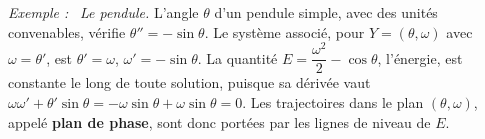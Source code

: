 \documentclass[a4paper,twoside]{report}
\newcommand{\mot}[1]{\textcolor{rougecours}{\textbf{#1}}}
\newenvironment{exemple}%
 {\par\needspace{6\baselineskip}\vspace{1mm}\begin{list}{}{\leftmargin=1cm \rightmargin=0.5cm}\item[]%
  \textit{Exemple :}~}%
 {\end{list}\vspace{1mm}}
\begin{document}
\begin{exemple}
\emph{Le pendule.} L'angle $\theta$ d'un pendule simple, avec des unités convenables, vérifie $\theta'' = -\sin\theta$. Le système associé, pour $Y = (\theta, \omega)$ avec $\omega = \theta'$, est $\theta' = \omega$, $\omega' = -\sin\theta$. La quantité $E = \dfrac{\omega^{2}}{2} - \cos\theta$, l'énergie, est constante le long de toute solution, puisque sa dérivée vaut $\omega\omega' + \theta'\sin\theta = -\omega\sin\theta + \omega\sin\theta = 0$. Les trajectoires dans le plan $(\theta, \omega)$, appelé \mot{plan de phase}, sont donc portées par les lignes de niveau de $E$.
\end{exemple}

\end{document}
